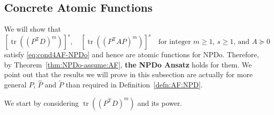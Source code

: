 \documentclass[11pt]{article}
\def\wtd{\widetilde}
\def\what{\widehat}
\DeclareMathOperator{\tr}{tr}
\DeclareMathOperator{\T}{T}
\theoremstyle{definition}
\numberwithin{equation}{section}
\begin{document}
\subsection{Concrete Atomic Functions}\label{ssec:AF-concrete-NPD}
We will show  that
\begin{equation}\label{eq:concrete-AF:NPD}
[\tr((P^{\T}D)^m)]^s, \quad
        [\tr((P^{\T}AP)^m)]^s\quad
\mbox{for integer $m\ge 1$, $s\ge 1$, and $A\succeq 0$}
\end{equation}
satisfy \eqref{eq:cond4AF-NPDo}
and hence are atomic functions for NPDo.
Therefore, by Theorem~\ref{thm:NPDo-assume:AF}, {\bf the NPDo Ansatz} holds for them.
We point out that the results we will prove in this subsection are actually for more general
$P$, $\what P$ and $\wtd P$ than required in Definition~\ref{defn:AF:NPD}.

We start by considering $\tr((P^{\T}D)^m)$ and its power.
\end{document}
